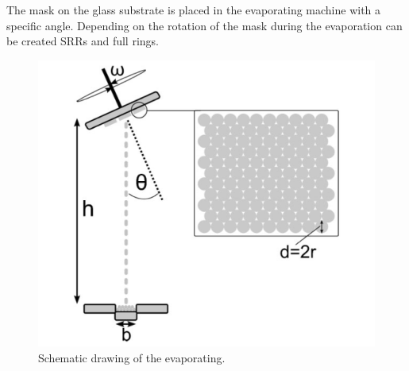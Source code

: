 The mask on the glass substrate is placed in the evaporating machine with a specific angle. Depending on the rotation of the mask during the evaporation can be created SRRs and full rings. 
\begin{figure}[H]
\centering
\includegraphics[scale=1]{../figures/evaporation.png}
\caption{Schematic drawing of the evaporating. \cite{paper_Giessen_meta}  }
    \label{spectrum_theory}
\end{figure}
